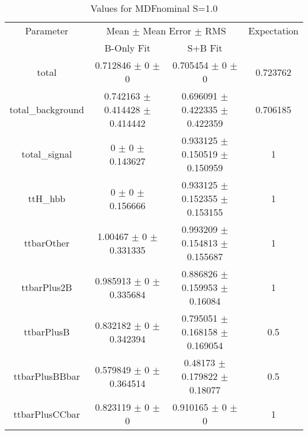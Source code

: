 \begin{table}
\centering
\caption{Values for MDFnominal S=1.0}
\begin{tabular}{cccc}
\toprule
Parameter & \multicolumn{2}{c}{Mean $\pm$ Mean Error $\pm$ RMS} & Expectation\\
 & B-Only Fit & S+B Fit & \\
\midrule
total & \num{0.712846} $\pm$ \num{0} $\pm$ \num{0} & \num{0.705454} $\pm$ \num{0} $\pm$ \num{0} & \num{0.723762}\\
total\_background & \num{0.742163} $\pm$ \num{0.414428} $\pm$ \num{0.414442} & \num{0.696091} $\pm$ \num{0.422335} $\pm$ \num{0.422359} & \num{0.706185}\\
total\_signal & \num{0} $\pm$ \num{0} $\pm$ \num{0.143627} & \num{0.933125} $\pm$ \num{0.150519} $\pm$ \num{0.150959} & \num{1}\\
ttH\_hbb & \num{0} $\pm$ \num{0} $\pm$ \num{0.156666} & \num{0.933125} $\pm$ \num{0.152355} $\pm$ \num{0.153155} & \num{1}\\
ttbarOther & \num{1.00467} $\pm$ \num{0} $\pm$ \num{0.331335} & \num{0.993209} $\pm$ \num{0.154813} $\pm$ \num{0.155687} & \num{1}\\
ttbarPlus2B & \num{0.985913} $\pm$ \num{0} $\pm$ \num{0.335684} & \num{0.886826} $\pm$ \num{0.159953} $\pm$ \num{0.16084} & \num{1}\\
ttbarPlusB & \num{0.832182} $\pm$ \num{0} $\pm$ \num{0.342394} & \num{0.795051} $\pm$ \num{0.168158} $\pm$ \num{0.169054} & \num{0.5}\\
ttbarPlusBBbar & \num{0.579849} $\pm$ \num{0} $\pm$ \num{0.364514} & \num{0.48173} $\pm$ \num{0.179822} $\pm$ \num{0.18077} & \num{0.5}\\
ttbarPlusCCbar & \num{0.823119} $\pm$ \num{0} $\pm$ \num{0} & \num{0.910165} $\pm$ \num{0} $\pm$ \num{0} & \num{1}\\
\bottomrule
\end{tabular}
\end{table}